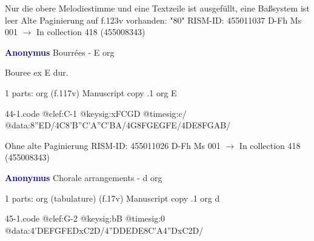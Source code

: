 \documentclass[twocolumn]{book}
\begin{document}
\newline Nur die obere Melodiestimme und eine Textzeile ist ausgefüllt, eine Baßsystem ist leer
\newline Alte Paginierung auf f.123v vorhanden: "80"
\newline RISM-ID: 455011037
\newline D-Fh  Ms 001
\newline $\rightarrow$ In collection 418 (455008343)
      
\newline \par \vspace{7pt} \textcolor{darkblue}{\textbf{Anonymus  }}
\newline Bourrées - E
\newline org
\newline \begin{itshape}[f.117v, heading:] Bouree ex E dur.\end{itshape} 
\newline \textcolor{darkblue}{}  1 parts: org  (f.117v)
\newline Manuscript copy
.1  org  E  
\begin{filecontents*}{44-1.code}
@clef:C-1
@keysig:xFCGD
@timesig:c/
@data:{8''ED}/4C{8'B''C}{'A''C'BA}/4G{8FG}{EGFE}/4DE{8FGAB}/
\end{filecontents*}
\newline
%

\newline Ohne alte Paginierung
\newline RISM-ID: 455011026
\newline D-Fh  Ms 001
\newline $\rightarrow$ In collection 418 (455008343)
      
\newline \par \vspace{7pt} \textcolor{darkblue}{\textbf{Anonymus  }}
\newline Chorale arrangements - d
\newline org
\newline \begin{itshape}\end{itshape} 
\newline \textcolor{darkblue}{}  1 parts: org (tabulature)  (f.17v)
\newline Manuscript copy
.1  org  d  
\begin{filecontents*}{45-1.code}
@clef:G-2
@keysig:bB
@timesig:0
@data:4'DEFGFEDxC2D/4''DDEDE{8C'A}4''DxC2D/
\end{filecontents*}
\newline
%
\end{document}
